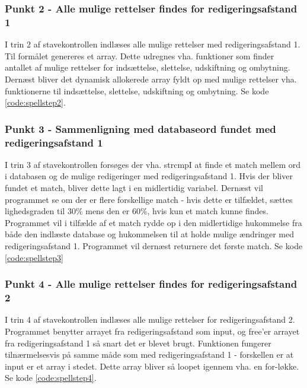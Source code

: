 
\subsubsection*{Punkt 2 - Alle mulige rettelser findes for redigeringsafstand 1}
I trin 2 af stavekontrollen indlæses alle mulige rettelser med redigeringsafstand 1. Til formålet genereres et array. Dette udregnes vha. funktioner som finder antallet af mulige rettelser for indsættelse, slettelse, udskiftning og ombytning.\\

Dernæst bliver det dynamisk allokerede array fyldt op med mulige rettelser vha. funktionerne til indsættelse, slettelse, udskiftning og ombytning. Se kode \ref{code:spellstep2}.


\subsubsection*{Punkt 3 - Sammenligning med databaseord fundet med redigeringsafstand 1}
I trin 3 af stavekontrollen forsøges der vha. strcmpI at finde et match mellem ord i databasen og de mulige redigeringer med redigeringsafstand 1. Hvis der bliver fundet et match, bliver dette lagt i en midlertidig variabel. Dernæst vil programmet se om der er flere forskellige match - hvis dette er tilfældet, sættes lighedsgraden til 30\% mens den er 60\%, hvis kun et match kunne findes. Programmet vil i tilfælde af et match rydde op i den midlertidige hukommelse fra både den indlæste database og hukommelsen til at holde mulige ændringer med redigeringsafstand 1. Programmet vil dernæst returnere det første match. Se kode \ref{code:spellstep3}


\subsubsection*{Punkt 4 - Alle mulige rettelser findes for redigeringsafstand 2}
I trin 4 af stavekontrollen indlæses alle mulige rettelser for redigeringsafstand 2. Programmet benytter arrayet fra redigeringsafstand som input, og free'er arrayet fra redigeringsafstand 1 så snart det er blevet brugt. Funktionen fungerer tilnærmelsesvis på samme måde som med redigeringsafstand 1 - forskellen er at input er et array i stedet. Dette array bliver så loopet igennem vha. en for-løkke. Se kode \ref{code:spellstep4}.

